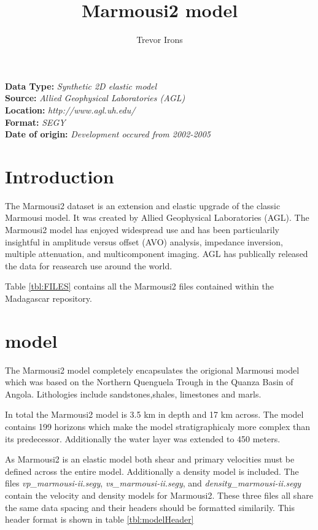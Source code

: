 \title{Marmousi2 model}
\author{Trevor Irons}
\lstset{language=python,numbers=left,numberstyle=\tiny,showstringspaces=false}
\maketitle

\noindent
\textbf {Data Type:} \emph{Synthetic 2D elastic model}\\
\textbf {Source:} \emph{Allied Geophysical Laboratories (AGL)}\\
\textbf {Location:} \emph{http://www.agl.uh.edu/}\\
\textbf {Format:} \emph{SEGY} \\
\textbf{Date of origin:} \emph{Development occured from 2002-2005}\\

\section{Introduction}
The Marmousi2 dataset is an extension and elastic upgrade of the classic Marmousi model. It was created by Allied Geophysical 
Laboratories (AGL).  The Marmousi2 model has enjoyed widespread use and has been particularily insightful in amplitude versus
offset (AVO) analysis, impedance inversion, multiple attenuation, and multicomponent imaging.  AGL has publically released 
the data for reasearch use around the world.   

Table \ref{tbl:FILES} contains all the Marmousi2 files contained within the Madagascar repository.  

{
\tiny

\normalsize
}

\section{model}
The Marmousi2 model completely encapsulates the origional Marmousi model which was based on the Northern Quenguela Trough 
in the Quanza Basin of Angola.  Lithologies include sandstones,shales, limestones and marls.    

In total the Marmousi2 model is 3.5 km in depth and 17 km across.  The model contains 199 horizons which make the model 
stratigraphicaly more complex than its predecessor.  Additionally the water layer was extended to 450 meters.   

As Marmousi2 is an elastic model both shear and primary velocities must be defined across the entire model.  
Additionally a density model is included.  
The files \emph{vp\_marmousi-ii.segy}, \emph{vs\_marmousi-ii.segy}, and \emph{density\_marmousi-ii.segy} contain the velocity and 
density models for Marmousi2.  These three files all share the same data spacing and their headers should be formatted similarily.
This header format is shown in table \ref{tbl:modelHeader}

